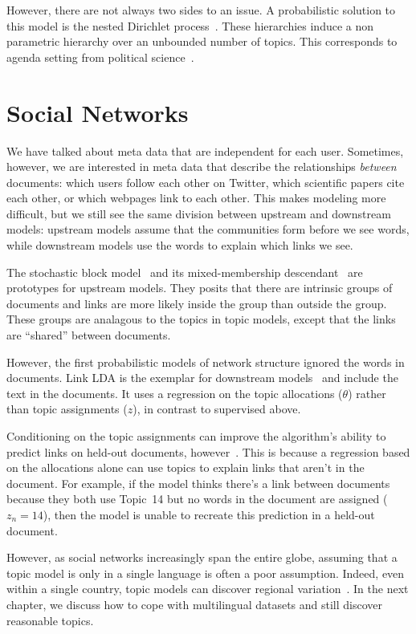 
However, there are not always two sides to an issue.  A probabilistic
solution to this model is the nested Dirichlet
process~\citep{blei-07}.  These hierarchies induce a non parametric
hierarchy over an unbounded number of topics.  This corresponds to
agenda setting from political
science~\citep{Nguyen:Boyd-Graber:Resnik:Miler-2015}.


\section{Social Networks}

We have talked about meta data that are independent for each user.
Sometimes, however, we are interested in meta data that describe the
relationships \emph{between} documents: which users follow each other
on Twitter, which scientific papers cite each other, or which webpages
link to each other.  This makes modeling more difficult, but we still
see the same division between upstream and downstream models: upstream
models assume that the communities form before we see words, while
downstream models use the words to explain which links we see.

The stochastic block model~\citep{holland-83} and its mixed-membership
descendant~\citep{airoldi-08} are prototypes for upstream models.
They posits that there are intrinsic groups of documents and links are
more likely inside the group than outside the group.  These groups are
analagous to the topics in topic models, except that the links are
``shared'' between documents.

However, the first probabilistic models of network structure ignored
the words in documents.  Link LDA is the exemplar for downstream
models~\cite{nallapati-08} and include the text in the documents.  It
uses a regression on the topic allocations ($\theta$) rather than
topic assignments ($z$), in contrast to supervised  above.

Conditioning on the topic assignments can improve the algorithm's
ability to predict links on held-out documents,
however~\citep{chang-09a}.  This is because a regression based on the
allocations alone can use topics to explain links that aren't in the
document.  For example, if the model thinks there's a link between
documents because they both use Topic~14 but no words in the document
are assigned ($z_n=14$), then the model is unable to recreate this
prediction in a held-out document.


However, as social networks increasingly span the entire globe,
assuming that a topic model is only in a single language is often a
poor assumption.  Indeed, even within a single country, topic models
can discover regional variation~\citep{eisenstein-10}.  In the next
chapter, we discuss how to cope with multilingual datasets and still
discover reasonable topics.

